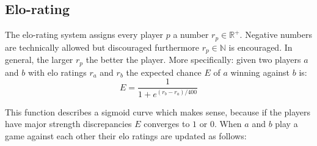\documentclass[12pt]{article}
\begin{document}
\subsection{Elo-rating} \label{sec:Evaluation:elo-rating}
The elo-rating system assigns every player \(p\) a number \(r_p \in \mathbb{R}^+\). Negative numbers are technically allowed but discouraged furthermore \(r_p \in  \mathbb N\) is encouraged. In general, the larger \(r_p\) the better the player. More specifically: given two players \(a\) and \(b\) with elo ratings \(r_a\) and \(r_b\) the expected chance \(E\) of \(a\) winning against \(b\) is\cite{silver2018general}:
\begin{equation} \label{eq:elo_pred}
E = \frac{1}{1 + e^{(r_b-r_a)/400}}
\end{equation}
\begin{center}

\end{center}
This function describes a sigmoid curve which makes sense, because if the players have major strength discrepancies \(E\) converges to \(1\) or \(0\). When \(a\) and \(b\) play a game against each other their elo ratings are updated as follows\cite{elo1978rating}:
\end{document}
